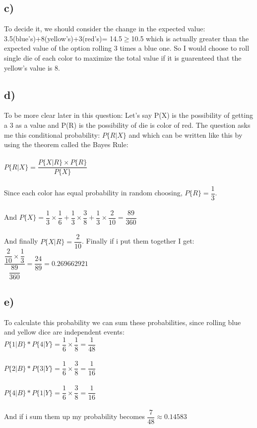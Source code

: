 \documentclass[12pt]{article}
\begin{document}
\subsection*{c)} 
To decide it, we should consider the change in the expected value: 3.5(blue's)+8(yellow's)+3(red's)= 14.5$\geq$10.5 which is actually greater than the expected value of the option rolling 3 times a blue one. So I would choose to roll single die of each color to maximize the total value if it is guarenteed that the yellow's value is 8.

\subsection*{d)}
To be more clear later in this question: Let's say P(X) is the possibility of getting a 3 as a value and P(R) is the possibility of die is color of red.
The question asks me this conditional probability:
$P\{R|X\}$ and which can be written like this by using the theorem called the Bayes Rule:\\\\
$P\{R|X\}=\dfrac{P\{X|R\} \times P\{R\}}{P\{X\}}$\\\\
Since each color has equal probability in random choosing, $P\{R\}=\dfrac{1}{3}$.\\\\
And $P\{X\}=\dfrac{1}{3}\times\dfrac{1}{6}+\dfrac{1}{3}\times\dfrac{3}{8}+\dfrac{1}{3}\times\dfrac{2}{10}=\dfrac{89}{360}$\\\\
And finally $P\{X|R\}=\dfrac{2}{10}$. Finally if i put them together I get:
$\dfrac{\dfrac{2}{10}\times\dfrac{1}{3}}{\dfrac{89}{360}}=\dfrac{24}{89}=0.269662921$



\subsection*{e)}
To calculate this probability we can sum these probabilities, since rolling blue and yellow dice are independent events:\\
$P\{1|B\}*P\{4|Y\}=\dfrac{1}{6}\times\dfrac{1}{8}=\dfrac{1}{48}$\\\\
$P\{2|B\}*P\{3|Y\}=\dfrac{1}{6}\times\dfrac{3}{8}=\dfrac{1}{16}$\\\\
$P\{4|B\}*P\{1|Y\}=\dfrac{1}{6}\times\dfrac{3}{8}=\dfrac{1}{16}$\\\\And if i sum them up my probability becomes $\dfrac{7}{48}\approx0.14583$
\end{document}
